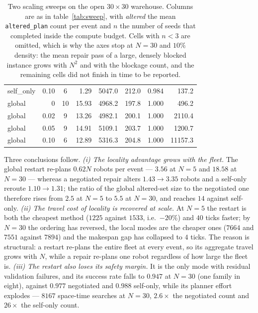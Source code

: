 \documentclass[10pt,a4paper]{article}
\newcommand{\code}[1]{\texttt{#1}}
\begin{document}
\begin{table}[H]
\begin{tabular}{@{}l r c r r r c r@{}}
self\_only & 0.10 &  6 & 1.29 & 5047.0 & 212.0 & 0.984 &   137.2\\
global & 0    & 10 & 15.93 & 4968.2 & 197.8 & 1.000 &   496.2\\
global & 0.02 &  9 & 13.26 & 4982.1 & 200.1 & 1.000 &  2110.4\\
global & 0.05 &  9 & 14.91 & 5109.1 & 203.7 & 1.000 &  1200.7\\
global & 0.10 &  6 & 12.89 & 5316.3 & 204.8 & 1.000 & 11157.3\\
\bottomrule
\end{tabular}
\caption{Two scaling sweeps on the open $30\times30$ warehouse.  Columns are as
in table~\ref{tab:sweep}, with \emph{altered} the mean \code{altered\_plan}
count per event and $n$ the number of seeds that completed inside the compute
budget.  Cells with $n<3$ are omitted, which is why the axes stop at $N=30$ and
$10\%$ density: the mean repair pass of a large, densely blocked instance grows
with $N^{2}$ and with the blockage count, and the remaining cells did not
finish in time to be reported.}
\label{tab:scaling}
\end{table}

Three conclusions follow.  \emph{(i) The locality advantage grows with the
fleet.}  The global restart re-plans $0.62N$ robots per event --- $3.56$ at
$N=5$ and $18.58$ at $N=30$ --- whereas a negotiated repair alters
$1.43 \rightarrow 3.35$ robots and a self-only reroute $1.10 \rightarrow 1.31$;
the ratio of the global altered-set size to the negotiated one therefore rises
from $2.5$ at $N=5$ to $5.5$ at $N=30$, and reaches $14$ against self-only.
\emph{(ii) The travel cost of locality is recovered at scale.}  At $N=5$ the
restart is both the cheapest method ($1225$ against $1533$, i.e.\ $-20\%$) and
$40$ ticks faster; by $N=30$ the ordering has reversed, the local modes are the
cheaper ones ($7664$ and $7551$ against $7894$) and the makespan gap has
collapsed to $4$ ticks.  The reason is structural: a restart re-plans the entire
fleet at every event, so its aggregate travel grows with $N$, while a repair
re-plans one robot regardless of how large the fleet is.  \emph{(iii) The
restart also loses its safety margin.}  It is the only mode with residual
validation failures, and its success rate falls to $0.947$ at $N=30$ (one family
in eight), against $0.977$ negotiated and $0.988$ self-only, while its planner
effort explodes --- $8167$ space-time searches at $N=30$, $2.6\times$ the
negotiated count and $26\times$ the self-only count.
\end{document}
